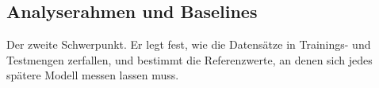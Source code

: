 \documentclass[12pt,a4paper]{article}
\begin{document}

\subsection{Analyserahmen und Baselines}
\label{sec:rahmen-baselines}

Der zweite Schwerpunkt. Er legt fest, wie die Datensätze in Trainings- und
Testmengen zerfallen, und bestimmt die Referenzwerte, an denen sich jedes
spätere Modell messen lassen muss.
\end{document}
